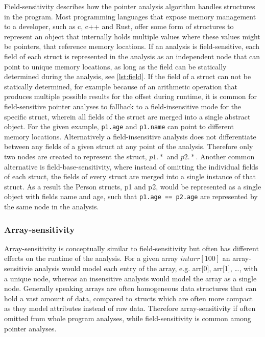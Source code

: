Field-sensitivity describes how the pointer analysis algorithm handles structures in the program.
Most programming languages that expose memory management to a developer, such as c, c++ and Rust, offer some form of structures to represent an object that internally holds multiple values where these values might be pointers, that reference memory locations.
If an analysis is field-sensitive, each field of each struct is represented in the analysis as an independent node that can point to unique memory locations, as long as the field can be statically determined during the analysis, see \autoref{lst:field}.
If the field of a struct can not be statically determined, for example because of an arithmetic operation that produces multiple possible results for the offset during runtime, it is common for field-sensitive pointer analyses to fallback to a field-insensitive mode for the specific struct, wherein all fields of the struct are merged into a single abstract object.
For the given example, \verb|p1.age| and \verb|p1.name| can point to different memory locations.
Alternatively a field-insensitive analysis does not differentiate between any fields of a given struct at any point of the analysis.
Therefore only two nodes are created to represent the struct, $p1.*$ and $p2.*$.
Another common alternative is field-base-sensitivity, where instead of omitting the individual fields of each struct, the fields of every struct are merged into a single instance of that struct.
As a result the Person structs, p1 and p2, would be represented as a single object with fields name and age, such that \verb|p1.age == p2.age| are represented by the same node in the analysis.

\subsubsection{Array-sensitivity}
Array-sensitivity is conceptually similar to field-sensitivity but often has different effects on the runtime of the analysis.
For a given array $int arr[100]$ an array-sensitivie analysis would model each entry of the array, \newline e.g. arr[0], arr[1], \dots, with a unique node, whereas an insensitive analysis would model the array as a single node.
Generally speaking arrays are often homogeneous data structures that can hold a vast amount of data, compared to structs which are often more compact as they model attributes instead of raw data.
Therefore array-sensitivity if often omitted from whole program analyses, while field-sensitivity is common among pointer analyses.

